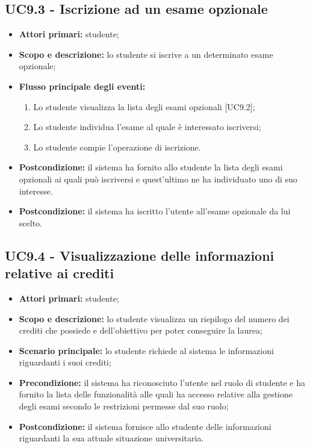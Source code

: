 \documentclass[AnalisiDeiRequisiti.tex]{subfiles}
\begin{document}
\subsection{UC9.3 - Iscrizione ad un esame opzionale}
\begin{itemize}
	\item \textbf{Attori primari:} studente;
	\item \textbf{Scopo e descrizione:} lo studente si iscrive a un determinato esame opzionale;
	\item \textbf{Flusso principale degli eventi:}
	\begin{enumerate}
		\item Lo studente visualizza la lista degli esami opzionali [UC9.2];
		\item Lo studente individua l'esame al quale è interessato iscriversi;
		\item Lo studente compie l'operazione di iscrizione.
	\end{enumerate}
	\item \textbf{Postcondizione:} il sistema ha fornito allo studente la lista degli esami opzionali ai quali può iscriversi e quest'ultimo ne ha individuato uno di suo interesse.
	\item \textbf{Postcondizione:} il sistema ha iscritto l'utente all'esame opzionale da lui scelto.
\end{itemize}

\subsection{UC9.4 - Visualizzazione delle informazioni relative ai crediti}
\begin{itemize}
	\item \textbf{Attori primari:} studente;
	\item \textbf{Scopo e descrizione:} lo studente visualizza un riepilogo del numero dei crediti che possiede e dell'obiettivo per poter conseguire la laurea;
	\item \textbf{Scenario principale:} lo studente richiede al sistema le informazioni riguardanti i suoi crediti;
	\item \textbf{Precondizione:} il sistema ha riconosciuto l'utente nel ruolo di studente e ha fornito la lista delle funzionalità alle quali ha accesso relative alla gestione degli esami secondo le restrizioni permesse dal suo ruolo; 
	\item \textbf{Postcondizione:} il sistema fornisce allo studente delle informazioni riguardanti la sua attuale situazione universitaria.
\end{itemize}
\end{document}
